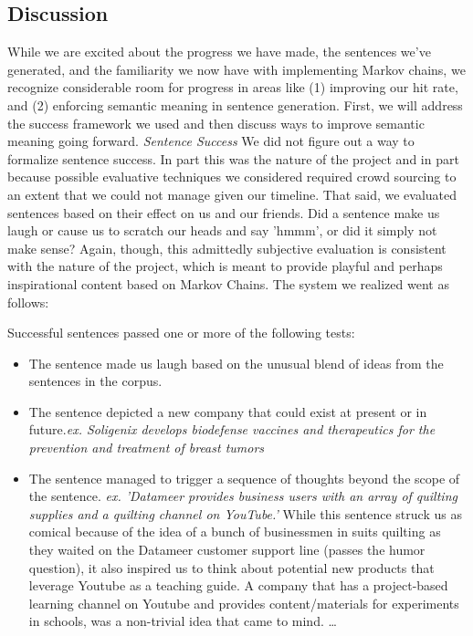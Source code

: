 \documentclass[11pt]{article}
\begin{document}
\subsection{Discussion}


While we are excited about the progress we have made, the sentences we've generated, and the familiarity we now have with implementing Markov chains, we recognize considerable room for progress in areas like (1) improving our hit rate, and (2) enforcing semantic meaning in sentence generation. First, we will address the success framework we used and then discuss ways to improve semantic meaning going forward. 
\newline
\textit{Sentence Success}
\newline
We did not figure out a way to formalize sentence success. In part this was the nature of the project and in part because possible evaluative techniques we considered required crowd sourcing to an extent that we could not manage given our timeline. That said, we evaluated sentences based on their effect on us and our friends. Did a sentence make us laugh or cause us to scratch our heads and say 'hmmm', or did it simply not make sense? Again, though, this admittedly subjective evaluation is consistent with the nature of the project, which is meant to provide playful and perhaps inspirational content based on Markov Chains. The system we realized went as follows:

Successful sentences passed one or more of the following tests:
\begin{itemize}

        \item The sentence made us laugh based on the unusual blend of ideas from the sentences in the corpus.

        \item The sentence depicted a new company that could exist at present or in future.\textit{ex. Soligenix develops biodefense vaccines and therapeutics for the prevention and treatment of breast tumors} 

        \item The sentence managed to trigger a sequence of thoughts beyond the scope of the sentence. \textit{ex. 'Datameer provides business users with an array of quilting supplies and a quilting channel on YouTube.'} While this sentence struck us as comical because of the idea of a bunch of businessmen in suits quilting as they waited on the Datameer customer support line (passes the humor question), it also inspired us to think about potential new products that leverage Youtube as a teaching guide. A company that has a project-based learning channel on Youtube and provides content/materials for experiments in schools, was a non-trivial idea that came to mind. \ldots 

\end{itemize}
\end{document}

